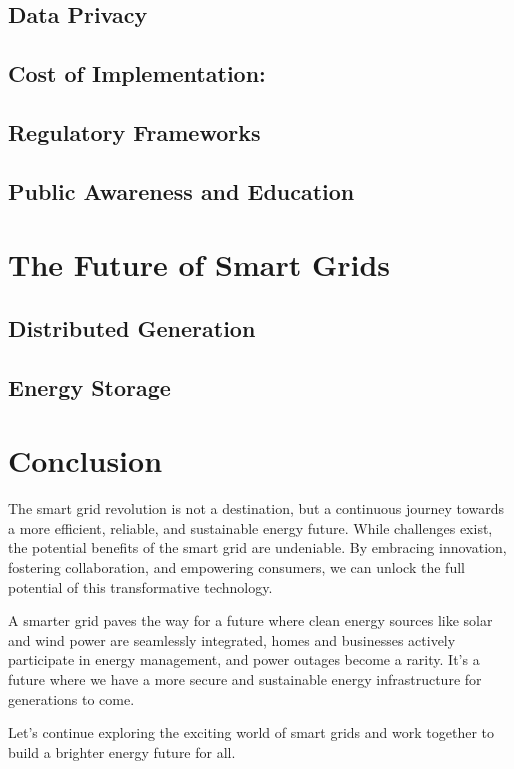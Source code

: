 \subsection{Data Privacy}
\subsection{Cost of Implementation:}
\subsection{Regulatory Frameworks}
\subsection{Public Awareness and Education}
\section{The Future of Smart Grids }  
\subsection{Distributed Generation}
\subsection{Energy Storage}
\newpage
\section*{Conclusion}
The smart grid revolution is not a destination, but a continuous journey towards a more efficient, reliable, and sustainable energy future. While challenges exist, the potential benefits of the smart grid are undeniable. By embracing innovation, fostering collaboration, and empowering consumers, we can unlock the full potential of this transformative technology.

A smarter grid paves the way for a future where clean energy sources like solar and wind power are seamlessly integrated, homes and businesses actively participate in energy management, and power outages become a rarity. It's a future where we have a more secure and sustainable energy infrastructure for generations to come.

Let's continue exploring the exciting world of smart grids and work together to build a brighter energy future for all.